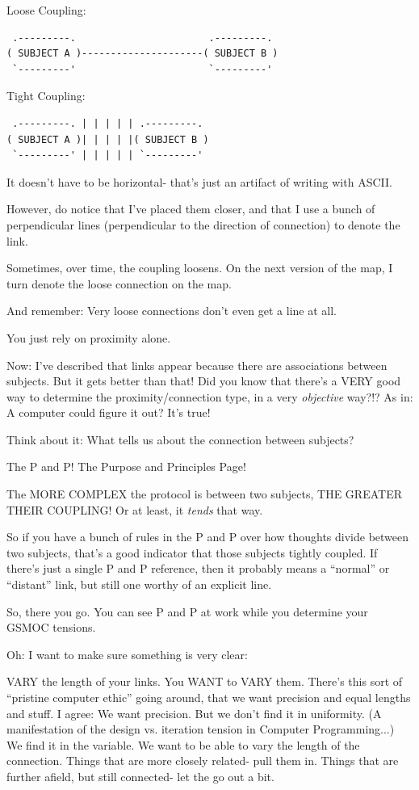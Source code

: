 \documentclass[oneside]{book}
\begin{document}
Loose Coupling:

\begin{verbatim}
 .---------.                       .---------.
( SUBJECT A )---------------------( SUBJECT B )
 `---------'                       `---------'
\end{verbatim}

Tight Coupling:

\begin{verbatim}
 .---------. | | | | | .---------.
( SUBJECT A )| | | | |( SUBJECT B )
 `---------' | | | | | `---------'
\end{verbatim}

It doesn't have to be horizontal- that's just an artifact of writing
with ASCII.

However, do notice that I've placed them closer, and that I use a
bunch of perpendicular lines (perpendicular to the direction of
connection) to denote the link.

Sometimes, over time, the coupling loosens. On the next version of the
map, I turn denote the loose connection on the map.

And remember: Very loose connections don't even get a line at all.

You just rely on proximity alone.

Now:
I've described that links appear because there are associations
between subjects. But it gets better than that! Did you know that
there's a VERY good way to determine the proximity/connection type, in
a very \emph{objective} way?!? As in: A computer could figure it out? It's
true!

Think about it: What tells us about the connection between subjects?

The P and P! The Purpose and Principles Page!

The MORE COMPLEX the protocol is between two subjects, THE GREATER
THEIR COUPLING! Or at least, it \emph{tends} that way.

So if you have a bunch of rules in the P and P over how thoughts divide
between two subjects, that's a good indicator that those subjects
tightly coupled. If there's just a single P and P reference, then it
probably means a ``normal'' or ``distant'' link, but still one worthy of
an explicit line.

So, there you go. You can see P and P at work while you determine your
GSMOC tensions.

Oh: I want to make sure something is very clear:

VARY the length of your links. You WANT to VARY them. There's this
sort of ``pristine computer ethic'' going around, that we want precision
and equal lengths and stuff. I agree: We want precision. But we don't
find it in uniformity. (A manifestation of the design vs. iteration
tension in Computer Programming...) We find it in the variable. We
want to be able to vary the length of the connection. Things that are
more closely related- pull them in. Things that are further afield,
but still connected- let the go out a bit.
\end{document}
